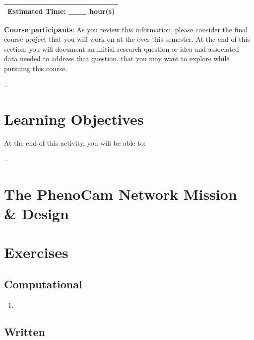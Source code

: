 \documentclass[]{book}
\begin{document}
\begin{longtable}[]{@{}l@{}}
\toprule
\endhead
Estimated Time: \_\_\_ hour(s)\tabularnewline
\bottomrule
\end{longtable}

\leavevmode\hypertarget{ds-challenge}{}%
\textbf{Course participants}: As you review this information, please
consider the
final course project
that you will work on at the over this semester. At the end of this section, you will
document an initial research question or idea and associated data needed to
address that question, that you may want to explore while pursuing this course.

\leavevmode\hypertarget{ds-objectives}{}%
--

\hypertarget{learning-objectives}{%
\section{Learning Objectives}\label{learning-objectives}}

At the end of this activity, you will be able to:

--

\hypertarget{the-phenocam-network-mission-design}{%
\section{The PhenoCam Network Mission \& Design}\label{the-phenocam-network-mission-design}}

\hypertarget{exercises}{%
\section{Exercises}\label{exercises}}

\hypertarget{computational}{%
\subsection{Computational}\label{computational}}

\begin{enumerate}
\def\labelenumi{\arabic{enumi}.}
\item
\end{enumerate}

\hypertarget{ds-challenge}{}
\hypertarget{written}{%
\subsection{Written}\label{written}}
\end{document}
